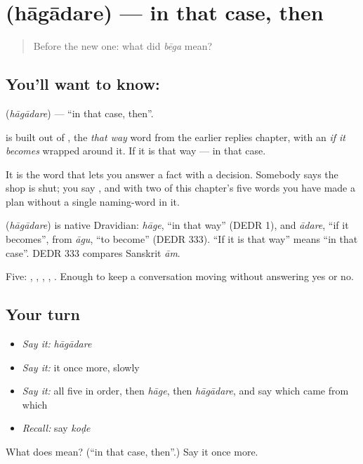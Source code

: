 \section[\texorpdfstring{\kn{ಹಾಗಾದರೆ} (hāgādare)}{ಹಾಗಾದರೆ (hāgādare)}]{ (hāgādare) — in that case, then}

\label{lesson:KA-C64-in-that-case}



\begin{quote}
Before the new one: what did \emph{bēga} mean?
\end{quote}

\subsection*{You'll want to know: }
\textbf{} (\emph{hāgādare}) — \textquotedblleft{}in that case, then\textquotedblright{}.

 is built out of , the \emph{that way} word from the earlier replies chapter, with an \emph{if it becomes} wrapped around it. If it is that way — in that case.

It is the word that lets you answer a fact with a decision. Somebody says the shop is shut; you say  , and with two of this chapter's five words you have made a plan without a single naming-word in it.

\begin{cousinweb}
\textbf{} (\emph{hāgādare}) is native Dravidian: \emph{hāge}, \textquotedblleft{}in that way\textquotedblright{} (DEDR 1), and \emph{ādare}, \textquotedblleft{}if it becomes\textquotedblright{}, from \emph{āgu}, \textquotedblleft{}to become\textquotedblright{} (DEDR 333). \textquotedblleft{}If it is that way\textquotedblright{} means \textquotedblleft{}in that case\textquotedblright{}. DEDR 333 compares Sanskrit \emph{ām}.
\end{cousinweb}

\begin{grammarlens}[title={What you've built}]
Five: , , , , . Enough to keep a conversation moving without answering yes or no.
\end{grammarlens}

\subsection*{Your turn}
\begin{itemize}
\raggedright
  \item \emph{Say it:} \emph{hāgādare}
  \item \emph{Say it:} it once more, slowly
  \item \emph{Say it:} all five in order, then \emph{hāge}, then \emph{hāgādare}, and say which came from which
  \item \emph{Recall:} say \emph{koḍe}
\end{itemize}

\begin{tcolorbox}[breakable,colback=teal!4,colframe=teal!35!black,title={Before you move on}]
What does  mean? (\textquotedblleft{}in that case, then\textquotedblright{}.) Say it once more.
\end{tcolorbox}
